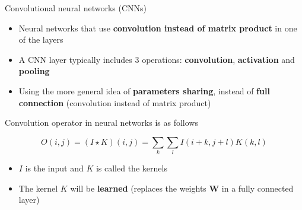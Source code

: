 \begin{frame}{Convolutional neural networks (CNNs)}
	\begin{itemize}
		\item Neural networks that use \textbf{convolution instead of matrix product} in one of the layers
		
		\medskip 
		
		\item A CNN layer typically includes 3 operations: \textbf{convolution}, \textbf{activation} and \textbf{pooling}
		
		\medskip 
				
		\item Using the more general idea of \textbf{parameters sharing}, instead of \textbf{full connection} (convolution instead of matrix product)
	\end{itemize}
	
	\bigskip 
	
	Convolution operator in neural networks is as follows
	
	\begin{equation*}
		O(i, j) = (I \star K)(i, j) = \sum_{k} \sum_{l} I(i + k, j + l) K(k, l)
	\end{equation*}
	\begin{itemize}
		\item $I$ is the input and $K$ is called the kernels
		\item The kernel $K$ will be \textbf{learned} (replaces the weights $\mathbf{W}$ in a fully connected layer)
	\end{itemize}
\end{frame}

